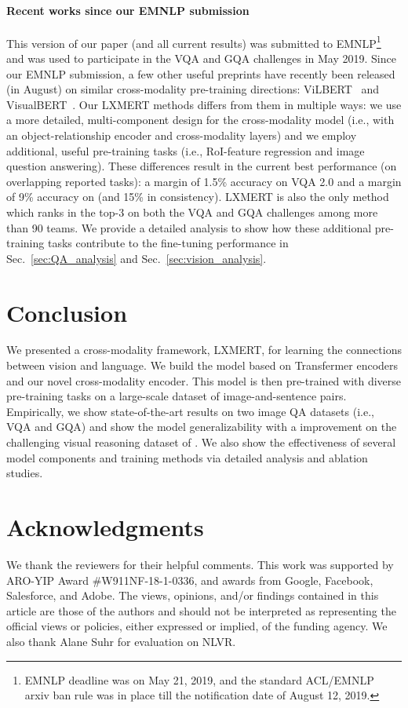 \documentclass[11pt,a4paper]{article}
\begin{document}
\paragraph{Recent works since our EMNLP submission}
This version of our paper (and all current results) was submitted to EMNLP\footnote{EMNLP deadline was on May 21, 2019, and the standard ACL/EMNLP arxiv ban rule was in place till the notification date of August 12, 2019.} and was used to participate in the VQA and GQA challenges in May 2019.
Since our EMNLP submission, a few other useful preprints have recently been released (in August) on similar cross-modality pre-training directions: ViLBERT~\cite{lu2019vilbert} and VisualBERT~\cite{li2019visualbert}.
Our LXMERT methods differs from them in multiple ways: we use a more detailed, multi-component design for the cross-modality model (i.e., with an object-relationship encoder and cross-modality layers) and we employ additional, useful pre-training tasks (i.e., RoI-feature regression and image question answering).
These differences result in the current best performance (on overlapping reported tasks): 
a margin of 1.5\% accuracy on VQA 2.0 and a margin of 9\% accuracy on  (and 15\% in consistency). LXMERT is also the only method which ranks in the top-3 on both the VQA and GQA challenges among more than 90 teams.
We provide a detailed analysis to show how these additional pre-training tasks contribute to the fine-tuning performance in Sec.~\ref{sec:QA_analysis} and Sec.~\ref{sec:vision_analysis}.
 
\section{Conclusion}
We presented a cross-modality framework, LXMERT, for learning the connections between vision and language.
We build the model based on Transfermer encoders and our novel cross-modality encoder.
This model is then pre-trained with diverse pre-training tasks on a large-scale dataset of image-and-sentence pairs.
Empirically, we show state-of-the-art results on two image QA datasets (i.e., VQA and GQA) and show the model generalizability with a  improvement on the challenging visual reasoning dataset of .
We also show the effectiveness of several model components and training methods via detailed analysis and ablation studies.

\section*{Acknowledgments}
We thank the reviewers for their helpful comments. This work was supported by ARO-YIP Award \#W911NF-18-1-0336, and awards from Google, Facebook, Salesforce, and Adobe. The views, opinions, and/or findings contained in this article are those of the authors and should not be interpreted as representing the official views or policies, either expressed or implied, of the funding agency. We also thank Alane Suhr for evaluation on NLVR. 
\end{document}
